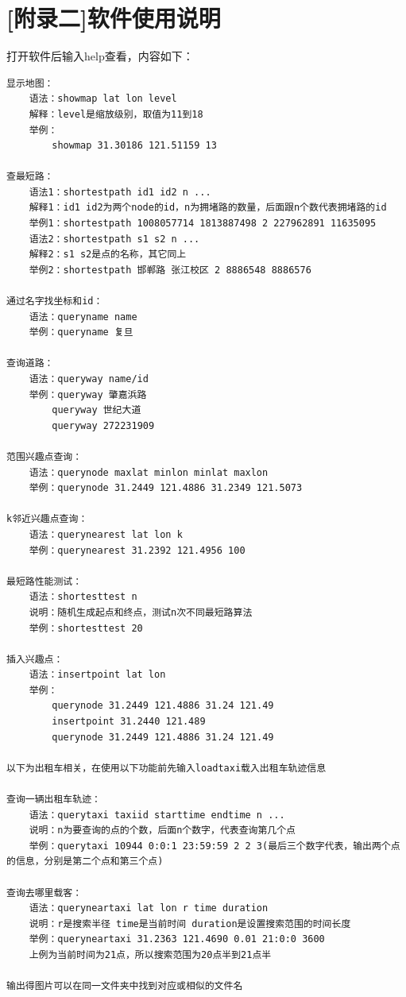 \documentclass[10pt]{scrartcl}
\begin{document}
\section{[附录二]软件使用说明}
打开软件后输入help查看，内容如下：
\begin{lstlisting}
显示地图：
    语法：showmap lat lon level
    解释：level是缩放级别，取值为11到18
    举例：
        showmap 31.30186 121.51159 13

查最短路：
    语法1：shortestpath id1 id2 n ...
    解释1：id1 id2为两个node的id，n为拥堵路的数量，后面跟n个数代表拥堵路的id
    举例1：shortestpath 1008057714 1813887498 2 227962891 11635095
    语法2：shortestpath s1 s2 n ...
    解释2：s1 s2是点的名称，其它同上
    举例2：shortestpath 邯郸路 张江校区 2 8886548 8886576

通过名字找坐标和id：
    语法：queryname name
    举例：queryname 复旦

查询道路：
    语法：queryway name/id
    举例：queryway 肇嘉浜路
        queryway 世纪大道
        queryway 272231909

范围兴趣点查询：
    语法：querynode maxlat minlon minlat maxlon
    举例：querynode 31.2449 121.4886 31.2349 121.5073

k邻近兴趣点查询：
    语法：querynearest lat lon k
    举例：querynearest 31.2392 121.4956 100

最短路性能测试：
    语法：shortesttest n
    说明：随机生成起点和终点，测试n次不同最短路算法
    举例：shortesttest 20

插入兴趣点：
    语法：insertpoint lat lon
    举例：
        querynode 31.2449 121.4886 31.24 121.49
        insertpoint 31.2440 121.489
        querynode 31.2449 121.4886 31.24 121.49

以下为出租车相关，在使用以下功能前先输入loadtaxi载入出租车轨迹信息

查询一辆出租车轨迹：
    语法：querytaxi taxiid starttime endtime n ...
    说明：n为要查询的点的个数，后面n个数字，代表查询第几个点
    举例：querytaxi 10944 0:0:1 23:59:59 2 2 3(最后三个数字代表，输出两个点的信息，分别是第二个点和第三个点)

查询去哪里载客：
    语法：queryneartaxi lat lon r time duration
    说明：r是搜索半径 time是当前时间 duration是设置搜索范围的时间长度
    举例：queryneartaxi 31.2363 121.4690 0.01 21:0:0 3600
    上例为当前时间为21点，所以搜索范围为20点半到21点半

输出得图片可以在同一文件夹中找到对应或相似的文件名
\end{lstlisting}
\end{document}
